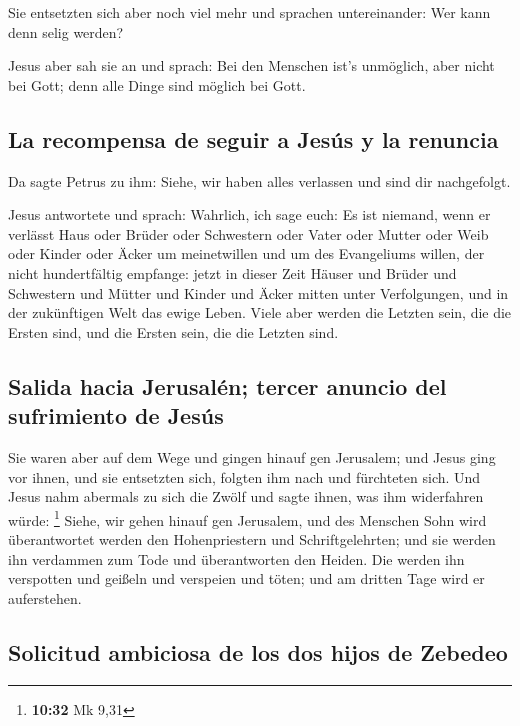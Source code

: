  Sie entsetzten sich aber noch viel mehr und sprachen
untereinander: Wer kann denn selig werden?

 Jesus aber sah sie an und sprach: Bei den Menschen ist's
unmöglich, aber nicht bei Gott; denn alle Dinge sind möglich bei Gott.

\hypertarget{la-recompensa-de-seguir-a-jesuxfas-y-la-renuncia}{%
\subsection{La recompensa de seguir a Jesús y la
renuncia}\label{la-recompensa-de-seguir-a-jesuxfas-y-la-renuncia}}

 Da sagte Petrus zu ihm: Siehe, wir haben alles verlassen
und sind dir nachgefolgt.

 Jesus antwortete und sprach: Wahrlich, ich sage euch: Es
ist niemand, wenn er verlässt Haus oder Brüder oder Schwestern oder
Vater oder Mutter oder Weib oder Kinder oder Äcker um meinetwillen und
um des Evangeliums willen,  der nicht hundertfältig
empfange: jetzt in dieser Zeit Häuser und Brüder und Schwestern und
Mütter und Kinder und Äcker mitten unter Verfolgungen, und in der
zukünftigen Welt das ewige Leben.  Viele aber werden die
Letzten sein, die die Ersten sind, und die Ersten sein, die die Letzten
sind.

\hypertarget{salida-hacia-jerusaluxe9n-tercer-anuncio-del-sufrimiento-de-jesuxfas}{%
\subsection{Salida hacia Jerusalén; tercer anuncio del sufrimiento de
Jesús}\label{salida-hacia-jerusaluxe9n-tercer-anuncio-del-sufrimiento-de-jesuxfas}}

 Sie waren aber auf dem Wege und gingen hinauf gen
Jerusalem; und Jesus ging vor ihnen, und sie entsetzten sich, folgten
ihm nach und fürchteten sich. Und Jesus nahm abermals zu sich die Zwölf
und sagte ihnen, was ihm widerfahren würde: \footnote{\textbf{10:32} Mk
  9,31}  Siehe, wir gehen hinauf gen Jerusalem, und des
Menschen Sohn wird überantwortet werden den Hohenpriestern und
Schriftgelehrten; und sie werden ihn verdammen zum Tode und
überantworten den Heiden.  Die werden ihn verspotten und
geißeln und verspeien und töten; und am dritten Tage wird er
auferstehen.

\hypertarget{solicitud-ambiciosa-de-los-dos-hijos-de-zebedeo}{%
\subsection{Solicitud ambiciosa de los dos hijos de
Zebedeo}\label{solicitud-ambiciosa-de-los-dos-hijos-de-zebedeo}}

